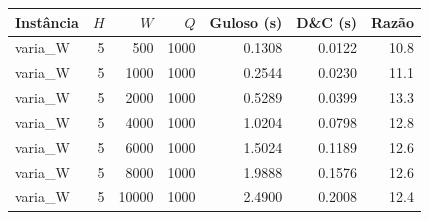 \begin{tabular}{lrrrrrr}
\toprule
Instância & $H$ & $W$ & $Q$ & Guloso (s) & D\&C (s) & Razão \\
\midrule
varia\_W & 5 & 500 & 1000 & 0.1308 & 0.0122 & 10.8 \\
varia\_W & 5 & 1000 & 1000 & 0.2544 & 0.0230 & 11.1 \\
varia\_W & 5 & 2000 & 1000 & 0.5289 & 0.0399 & 13.3 \\
varia\_W & 5 & 4000 & 1000 & 1.0204 & 0.0798 & 12.8 \\
varia\_W & 5 & 6000 & 1000 & 1.5024 & 0.1189 & 12.6 \\
varia\_W & 5 & 8000 & 1000 & 1.9888 & 0.1576 & 12.6 \\
varia\_W & 5 & 10000 & 1000 & 2.4900 & 0.2008 & 12.4 \\
\bottomrule
\end{tabular}

